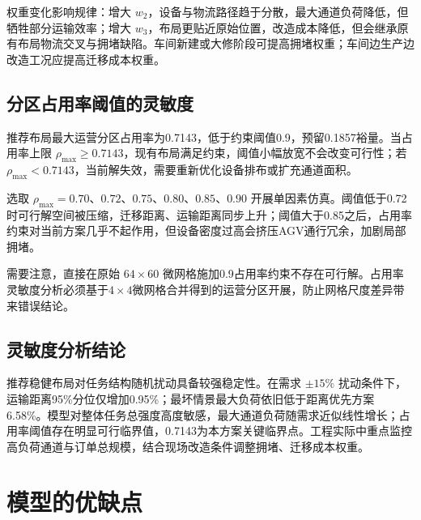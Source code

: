\documentclass[12pt,a4paper]{article}
\begin{document}
	权重变化影响规律：增大 $w_2$，设备与物流路径趋于分散，最大通道负荷降低，但牺牲部分运输效率；增大 $w_3$，布局更贴近原始位置，改造成本降低，但会继承原有布局物流交叉与拥堵缺陷。车间新建或大修阶段可提高拥堵权重；车间边生产边改造工况应提高迁移成本权重。
	
	\subsection{分区占用率阈值的灵敏度}
	推荐布局最大运营分区占用率为0.7143，低于约束阈值0.9，预留0.1857裕量。当占用率上限 $\rho_{\max}\ge 0.7143$，现有布局满足约束，阈值小幅放宽不会改变可行性；若 $\rho_{\max}<0.7143$，当前解失效，需要重新优化设备排布或扩充通道面积。
	
	选取 $\rho_{\max}=0.70、0.72、0.75、0.80、0.85、0.90$ 开展单因素仿真。阈值低于0.72时可行解空间被压缩，迁移距离、运输距离同步上升；阈值大于0.85之后，占用率约束对当前方案几乎不起作用，但设备密度过高会挤压AGV通行冗余，加剧局部拥堵。
	
	需要注意，直接在原始 $64\times60$ 微网格施加0.9占用率约束不存在可行解。占用率灵敏度分析必须基于$4\times4$微网格合并得到的运营分区开展，防止网格尺度差异带来错误结论。
	
	\subsection{灵敏度分析结论}
	推荐稳健布局对任务结构随机扰动具备较强稳定性。在需求 $\pm15\%$ 扰动条件下，运输距离95\%分位仅增加0.95\%；最坏情景最大负荷依旧低于距离优先方案6.58\%。模型对整体任务总强度高度敏感，最大通道负荷随需求近似线性增长；占用率阈值存在明显可行临界值，0.7143为本方案关键临界点。工程实际中重点监控高负荷通道与订单总规模，结合现场改造条件调整拥堵、迁移成本权重。
	
	
	\section{模型的优缺点}
\end{document}
